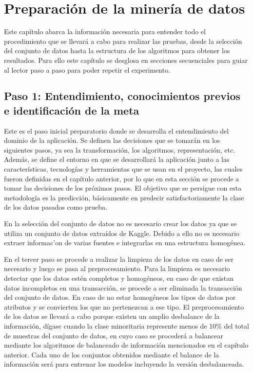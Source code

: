 \chapter{Preparaci\'{o}n de la miner\'{i}a de datos}

  Este cap\'{i}tulo abarca la informaci\'{o}n necesaria para entender todo el procedimiento que se llevar\'{a} a cabo para realizar las pruebas, desde la selecci\'{o}n del conjunto de datos hasta la estructura de los algoritmos para obtener los resultados. Para ello este cap\'{i}tulo se desglosa en secciones secuenciales para guiar al lector paso a paso para poder repetir el experimento.
  
  \section{Paso 1: Entendimiento, conocimientos previos e identificaci\'{o}n de la meta}

  Este es el paso inicial preparatorio donde se desarrolla el entendimiento del dominio de la aplicaci\'{o}n. Se definen las decisiones que se tomar\'{a}n en los siguientes pasos, ya sea la transformaci\'{o}n, los algoritmos, representaci\'{o}n, etc. Adem\'{a}s, se define el entorno en que se desarrollar\'{a} la aplicaci\'{o}n junto a las caracter\'{i}sticas, tecnolog\'{i}as y herramientas que se usan en el proyecto, las cuales fueron definidas en el cap\'{i}tulo anterior, por lo que en esta secci\'{o}n se procede a tomar las decisiones de los pr\'{o}ximos pasos. El objetivo que se persigue con esta metodolog\'{i}a es la predicci\'{o}n, b\'{a}sicamente en predecir satisfactoriamente la clase de los datos pasados como prueba.
  
  En la selecci\'{o}n del conjunto de datos no es necesario crear los datos ya que se utiliza un conjunto de datos extra\'{i}dos de Kaggle. Debido a ello no es necesario extraer informac'{o}n de varias fuentes e integrarlas en una estructura homog\'{e}nea.
  
  En el tercer paso se procede a realizar la limpieza de los datos en caso de ser necesario y luego se pasa al preprocesamiento. Para la limpieza es necesario detectar que los datos est\'{e}n completos y homog\'{e}neos, en caso de que existan datos incompletos en una transacci\'{o}n, se procede a ser eliminada la transacci\'{o}n del conjunto de datos. En caso de no estar homog\'{e}neos los tipos de datos por atributos y se convierten los que no pertenezcan a ese tipo. El preprocesamiento de los datos se llevar\'{a} a cabo porque existen un amplio desbalance de la informaci\'{o}n, d\'{i}gase cuando la clase minoritaria represente menos de 10\% del total de muestras del conjunto de datos, en cuyo caso se proceder\'{a} a balancear mediante los algoritmos de balanceado de informaci\'{o}n mencionados en el cap\'{i}tulo anterior. Cada uno de los conjuntos obtenidos mediante el balance de la informaci\'{o}n ser\'{a} para entrenar los modelos incluyendo la versi\'{o}n desbalanceada.

